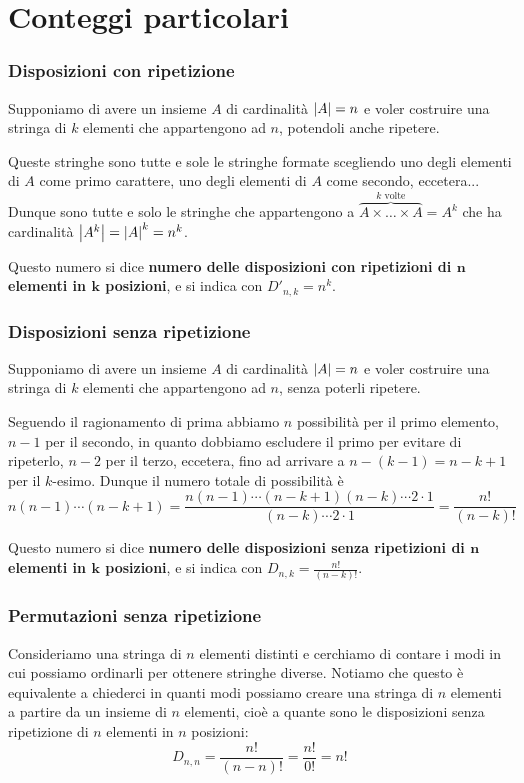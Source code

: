 \section{Conteggi particolari}

\subsubsection{Disposizioni con ripetizione}
Supponiamo di avere un insieme $A$ di cardinalità $\left|A\right| = n$ e voler costruire una stringa di $k$ elementi che appartengono ad $n$, potendoli anche ripetere.

Queste stringhe sono tutte e sole le stringhe formate scegliendo uno degli elementi di $A$ come primo carattere, uno degli elementi di $A$ come secondo, eccetera... Dunque sono tutte e solo le stringhe che appartengono a $\overbrace{A \times \dots \times A}^{k \text{ volte}} = A^k$ che ha cardinalità $\left|A^k\right| = \left|A\right|^k = n^k$.

Questo numero si dice \textbf{numero delle disposizioni con ripetizioni di $\bm{n}$ elementi in $\bm{k}$ posizioni}, e si indica con $D'_{n, k} = n^k$.

\subsubsection{Disposizioni senza ripetizione}
Supponiamo di avere un insieme $A$ di cardinalità $\left|A\right| = n$ e voler costruire una stringa di $k$ elementi che appartengono ad $n$, senza poterli ripetere.

Seguendo il ragionamento di prima abbiamo $n$ possibilità per il primo elemento, $n-1$ per il secondo, in quanto dobbiamo escludere il primo per evitare di ripeterlo, $n-2$ per il terzo, eccetera, fino ad arrivare a $n-(k-1) = n - k + 1$ per il $k$-esimo. Dunque il numero totale di possibilità è \[
    n(n-1)\cdots (n-k+1) = \frac{n(n-1)\cdots (n-k+1)(n-k)\cdots 2\cdot 1}{(n-k)\cdots 2\cdot 1} = \frac{n!}{(n-k)!}
\]

Questo numero si dice \textbf{numero delle disposizioni senza ripetizioni di $\bm{n}$ elementi in $\bm{k}$ posizioni}, e si indica con $D_{n, k} = \frac{n!}{(n-k)!}$.

\subsubsection{Permutazioni senza ripetizione}

Consideriamo una stringa di $n$ elementi distinti e cerchiamo di contare i modi in cui possiamo ordinarli per ottenere stringhe diverse. Notiamo che questo è equivalente a chiederci in quanti modi possiamo creare una stringa di $n$ elementi a partire da un insieme di $n$ elementi, cioè a quante sono le disposizioni senza ripetizione di $n$ elementi in $n$ posizioni: \[
    D_{n, n} = \frac{n!}{(n - n)!} = \frac{n!}{0!} = n!    
\]

